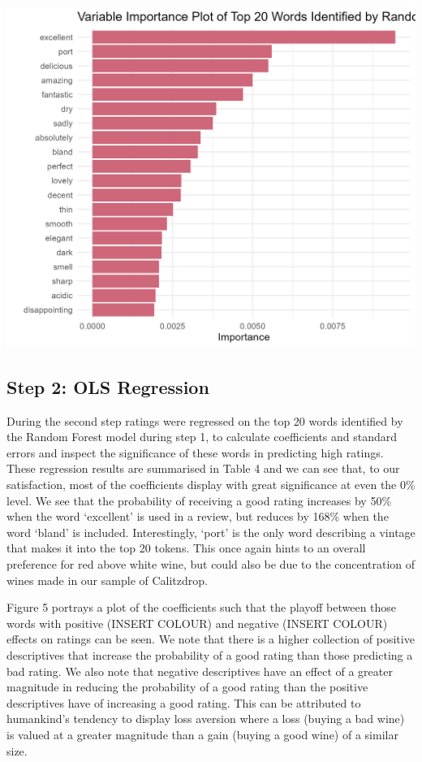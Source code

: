\documentclass[11pt,preprint]{elsarticle}
\let\origfigure\figure
\let\endorigfigure\endfigure
\renewenvironment{figure}[1][2] {
    \expandafter\origfigure\expandafter[H]
} {
    \endorigfigure
}
\numberwithin{equation}{section}
\numberwithin{figure}{section}
\numberwithin{table}{section}
\begin{document}
\begin{figure}[H]
\includegraphics[width=0.8\linewidth]{writeup/fig5} \caption{Variable Importance Plot of Top 20 Words in Reviews Identified by Random Forest Model}\label{fig:fig5}
\end{figure}

\subsection{Step 2: OLS Regression}\label{step-2-ols-regression}

During the second step ratings were regressed on the top 20 words
identified by the Random Forest model during step 1, to calculate
coefficients and standard errors and inspect the significance of these
words in predicting high ratings. These regression results are
summarised in Table 4 and we can see that, to our satisfaction, most of
the coefficients display with great significance at even the 0\% level.
We see that the probability of receiving a good rating increases by 50\%
when the word `excellent' is used in a review, but reduces by 168\% when
the word `bland' is included. Interestingly, `port' is the only word
describing a vintage that makes it into the top 20 tokens. This once
again hints to an overall preference for red above white wine, but could
also be due to the concentration of wines made in our sample of
Calitzdrop.

Figure 5 portrays a plot of the coefficients such that the playoff
between those words with positive (INSERT COLOUR) and negative (INSERT
COLOUR) effects on ratings can be seen. We note that there is a higher
collection of positive descriptives that increase the probability of a
good rating than those predicting a bad rating. We also note that
negative descriptives have an effect of a greater magnitude in reducing
the probability of a good rating than the positive descriptives have of
increasing a good rating. This can be attributed to humankind's tendency
to display loss aversion where a loss (buying a bad wine) is valued at a
greater magnitude than a gain (buying a good wine) of a similar size.
\end{document}
